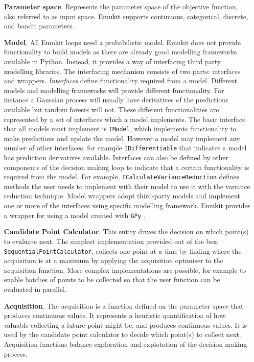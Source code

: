 \textbf{Parameter space}. Represents the parameter space of the objective function, also referred to as input space. Emukit supports continuous, categorical, discrete, and bandit parameters.

\textbf{Model}. All Emukit loops need a probabilistic model. Emukit does not provide functionality to build models as there are already good modelling frameworks available in Python. Instead, it provides a way of interfacing third party modelling libraries. The interfacing mechanism consists of two parts: interfaces and wrappers. \textit{Interfaces} define functionality required from a model. Different models and modelling frameworks will provide different functionality. For instance a Gaussian process will usually have derivatives of the predictions available but random forests will not. These different functionalities are represented by a set of interfaces which a model implements. The basic interface that all models must implement is \texttt{IModel}, which implements functionality to make predictions and update the model. However a model may implement any number of other interfaces, for example \texttt{IDifferentiable} that indicates a model has prediction derivatives available. Interfaces can also be defined by other components of the decision making loop to indicate that a certain functionality is required from the model. For example, \texttt{ICalculateVarianceReduction} defines methods the user needs to implement with their model to use it with the variance reduction technique. Model wrappers adopt third-party models and implement one or more of the interfaces using specific modelling framework. Emukit provides a wrapper for using a model created with \texttt{GPy} \cite{gpy2014}.

\textbf{Candidate Point Calculator}. This entity drives the decision on which point(s) to evaluate next. The simplest implementation provided out of the box, \texttt{SequentialPointCalculator}, collects one point at a time by finding where the acquisition is at a maximum by applying the acquisition optimiser to the acquisition function. More complex implementations are possible, for example to enable batches of points to be collected so that the user function can be evaluated in parallel.

\textbf{Acquisition}. The acquisition is a function defined on the parameter space that produces continuous values. It represents a heuristic quantification of how valuable collecting a future point might be, and produces continuous values. It is used by the candidate point calculator to decide which point(s) to collect next. Acquisition functions balance exploration and explotation of the decision making process.

